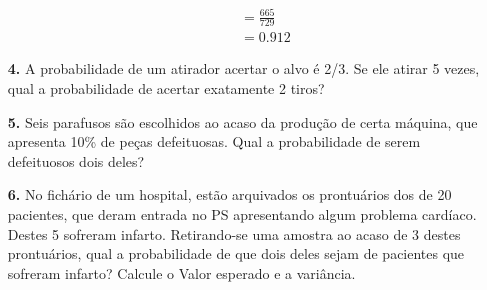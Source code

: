 \begin{itemize}
\begin{itemize}
{\begin{align*}
	        &= \frac{665}{729}\\
	        &= 0.912
	    \end{align*}}
	\end{itemize}
\newpage
	\item[\textbf{4.}] A probabilidade de um atirador acertar o alvo é 2/3. Se ele atirar 5 vezes, qual a probabilidade de acertar exatamente 2 tiros?\\
	\item[\textbf{5.}] Seis parafusos são escolhidos ao acaso da produção de certa máquina, que apresenta 10\% de peças defeituosas. Qual a probabilidade de serem defeituosos dois deles?\\
	\item[\textbf{6.}] No fichário de um hospital, estão arquivados os prontuários dos de 20 pacientes, que deram entrada no PS apresentando algum problema cardíaco. Destes 5 sofreram infarto. Retirando-se uma amostra ao acaso de 3 destes prontuários, qual a probabilidade de que dois deles sejam de pacientes que sofreram infarto? Calcule o Valor esperado e a variância.\\
\end{itemize}
